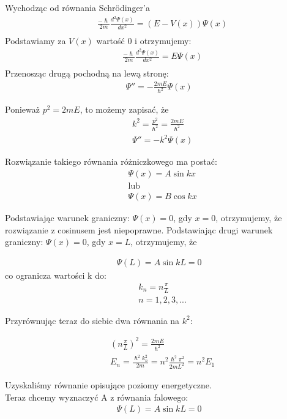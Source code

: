 \documentclass[a4paper,15pt]{article}
\begin{document}
Wychodząc od równania Schrödinger'a 
\begin{align*}
& \frac{-\hslash}{2m}\frac{d^2\Psi (x)}{dx^2} = (E-V(x))\Psi (x) \\
\end{align*}
Podstawiamy za $V(x)$ wartość 0 i otrzymujemy:
\begin{align*}
& \frac{-\hslash}{2m}\frac{d^2\Psi (x)}{dx^2} = E\Psi (x) \\
\end{align*}
Przenosząc drugą pochodną na lewą stronę:
\begin{align*}
\Psi '' = -\frac{2mE}{\hslash ^2}\Psi(x) 
\end{align*}

Ponieważ $p^2 = 2mE$, to możemy zapisać, że 
\begin{align*}
& k^2 = \frac{p^2}{\hslash ^2} = \frac{2mE}{\hslash ^2} \\
& \Psi '' = -k^2 \Psi(x) 
\end{align*}

Rozwiązanie takiego równania różniczkowego ma postać:
\begin{align*}
& \Psi (x) = A\sin kx \\
& \text{lub} \\
& \Psi (x) = B \cos kx
\end{align*}

Podstawiając warunek graniczny: $\Psi(x) = 0$, gdy $x = 0$, otrzymujemy, że rozwiązanie z cosinusem jest niepoprawne. 
Podstawiając drugi warunek graniczny: $\Psi(x) = 0$, gdy $x = L$, otrzymujemy, że

\begin{align*}
\Psi(L) = A\sin kL = 0
\end{align*}
co ogranicza wartości k do:
\begin{align*}
& k_n = n\frac{\pi}{L} \\
& n = 1,2,3,...
\end{align*}

Przyrównując teraz do siebie dwa równania na $k^2$:

\begin{align*}
& (n\frac{\pi}{L})^2 = \frac{2mE}{\hslash ^2} \\
& E_n = \frac{\hslash ^2k_{n}^2}{2m} = n^2\frac{\hslash ^2 \pi ^2}{2mL^2} = n^2E_1
\end{align*}

Uzyskaliśmy równanie opisujące poziomy energetyczne. \\

Teraz chcemy wyznaczyć A z równania falowego: 
\begin{align*}
\Psi(L) = A\sin kL = 0
\end{align*}
\end{document}
